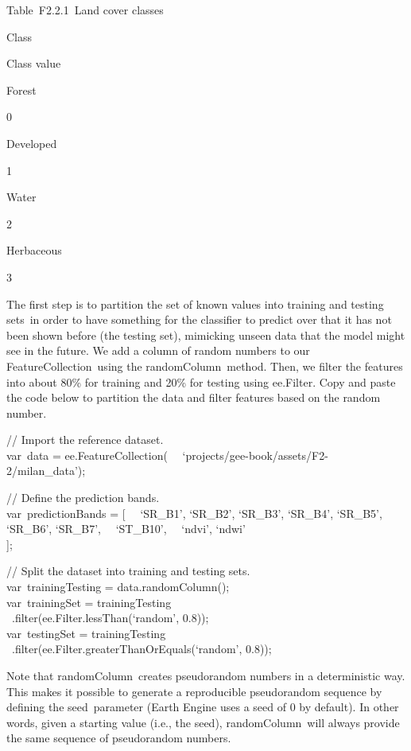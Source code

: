 \documentclass[
  letterpaper,
  DIV=11,
  numbers=noendperiod]{scrreprt}
\begin{document}
Table~F2.2.1~Land cover classes

Class

Class value

Forest

0

Developed

1

Water

2

Herbaceous

3

The first step is to partition the set of known values into training and
testing sets~in order to have something for the classifier to predict
over that it has not been shown before (the testing set), mimicking
unseen data that the model might see in the future. We add a column of
random numbers to our FeatureCollection~using the randomColumn~method.
Then, we filter the features into about 80\% for training and 20\% for
testing using ee.Filter. Copy and paste the code below to partition the
data and filter features based on the random number.

// Import the reference dataset.\\
var~data = ee.FeatureCollection(~
~`projects/gee-book/assets/F2-2/milan\_data');

// Define the prediction bands.\\
var~predictionBands = {[}~ ~`SR\_B1', `SR\_B2', `SR\_B3', `SR\_B4',
`SR\_B5', `SR\_B6', `SR\_B7',~ ~`ST\_B10',~ ~`ndvi', `ndwi'\\
{]};

// Split the dataset into training and testing sets.\\
var~trainingTesting = data.randomColumn();\\
var~trainingSet = trainingTesting\\
\hspace*{0.333em} ~.filter(ee.Filter.lessThan(`random', 0.8));\\
var~testingSet = trainingTesting\\
\hspace*{0.333em} ~.filter(ee.Filter.greaterThanOrEquals(`random',
0.8));

Note that randomColumn~creates pseudorandom numbers in a deterministic
way. This makes it possible to generate a reproducible pseudorandom
sequence by defining the seed~parameter (Earth Engine uses a seed of 0
by default). In other words, given a starting value (i.e., the seed),
randomColumn~will always provide the same sequence of pseudorandom
numbers.
\end{document}
